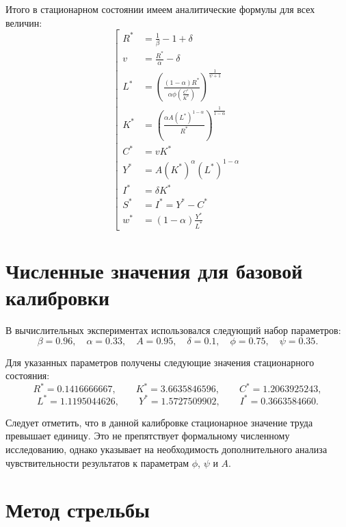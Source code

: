\documentclass[14pt,a4paper]{extreport}
\begin{document}
    Итого в стационарном состоянии имеем аналитические формулы для всех величин:
    \[
        \left[
        \begin{aligned}
            R^* &= \frac{1}{\beta} - 1 + \delta\\
            v &= \frac{R^*}{\alpha} - \delta \\
            L^* &=\left(\frac{(1-\alpha)R^*}{\alpha\phi\left(\frac{C^*}{K^*}\right)}\right)^{\frac{1}{\psi+1}} \\
            K^* &=\left(\frac{\alpha A (L^*)^{1-\alpha}}{R^*}\right)^{\frac{1}{1-\alpha}} \\
            C^* &= v K^* \\
            Y^* &= A(K^*)^{\alpha}(L^*)^{1 - \alpha} \\
            I^* &= \delta K^* \\
            S^* &= I^* = Y^* - C^* \\
            w^* &= (1-\alpha)\frac{Y^*}{L^*}
        \end{aligned}
        \right.
    \]

    \section{Численные значения для базовой калибровки}

    В вычислительных экспериментах использовался следующий набор параметров:
    \begin{equation}
    \beta=0.96, \quad
    \alpha=0.33, \quad
    A=0.95, \quad
    \delta=0.1, \quad
    \phi=0.75, \quad
    \psi=0.35.
    \end{equation}

    Для указанных параметров получены следующие значения стационарного состояния:
    \begin{equation}
    R^*=0.1416666667, \qquad
    K^*=3.6635846596, \qquad
    C^*=1.2063925243,
    \end{equation}
    \begin{equation}
    L^*=1.1195044626, \qquad
    Y^*=1.5727509902, \qquad
    I^*=0.3663584660.
    \end{equation}

    Следует отметить, что в данной калибровке стационарное значение труда превышает единицу. Это не препятствует формальному численному исследованию, однако указывает на необходимость дополнительного анализа чувствительности результатов к параметрам $\phi$, $\psi$ и $A$.

    \section{Метод стрельбы}
\end{document}
